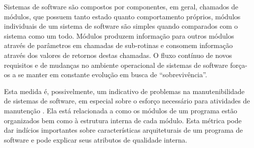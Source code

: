 Sistemas de software são compostos por componentes, em geral, chamados de
módulos, que possuem tanto estado quanto comportamento próprios,
módulos individuais de um sistema de software são simples quando comparados com
o sistema como um todo. Módulos produzem informação para outros módulos
através de parâmetros em chamadas de sub-rotinas e consomem informação através
dos valores de retornos destas chamadas. O fluxo contínuo de novos requisitos e
de mudanças no ambiente operacional de sistemas de software força-os a se
manter em constante evolução em busca de “sobrevivência”.

Esta medida é, possivelmente, um indicativo de problemas na manutenibilidade de
sistemas de software, em especial sobre o esforço necessário para atividades de
manutenção \cite{Terceiro2012}. Ela está relacionada a como os módulos de um
programa estão organizados bem como à estrutura interna de cada módulo. Esta
métrica pode dar indícios importantes sobre características arquiteturais de um
programa de software e pode explicar seus atributos de qualidade interna.



